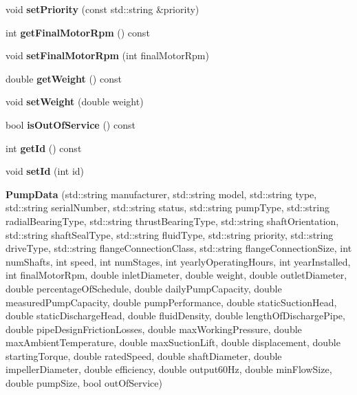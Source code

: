 \begin{DoxyCompactItemize}
\item 
\mbox{\label{class_pump_data_aea2420ebfa204d0bbda6f322729c11c3}} 
void {\bfseries set\+Priority} (const std\+::string \&priority)
\item 
\mbox{\label{class_pump_data_ace9256fdd3afebb9f2f8647234f7f9af}} 
int {\bfseries get\+Final\+Motor\+Rpm} () const
\item 
\mbox{\label{class_pump_data_a74de5295a37ed747c8bb0ba95271b536}} 
void {\bfseries set\+Final\+Motor\+Rpm} (int final\+Motor\+Rpm)
\item 
\mbox{\label{class_pump_data_a2e6aa462389c9319292ef4002674d009}} 
double {\bfseries get\+Weight} () const
\item 
\mbox{\label{class_pump_data_a5cc20c9d33c7000da4cf15ee8b857504}} 
void {\bfseries set\+Weight} (double weight)
\item 
\mbox{\label{class_pump_data_a638acde0858b29b9a086cf4cc6e4f73f}} 
bool {\bfseries is\+Out\+Of\+Service} () const
\item 
\mbox{\label{class_pump_data_ac7e900bf6d6ebdffb375b4d913ae6a06}} 
int {\bfseries get\+Id} () const
\item 
\mbox{\label{class_pump_data_a99da1d2ca8416ecbf85fe662ff97db45}} 
void {\bfseries set\+Id} (int id)
\item 
\mbox{\label{class_pump_data_abe0be07293009588aaca7f99170780dd}} 
{\bfseries Pump\+Data} (std\+::string manufacturer, std\+::string model, std\+::string type, std\+::string serial\+Number, std\+::string status, std\+::string pump\+Type, std\+::string radial\+Bearing\+Type, std\+::string thrust\+Bearing\+Type, std\+::string shaft\+Orientation, std\+::string shaft\+Seal\+Type, std\+::string fluid\+Type, std\+::string priority, std\+::string drive\+Type, std\+::string flange\+Connection\+Class, std\+::string flange\+Connection\+Size, int num\+Shafts, int speed, int num\+Stages, int yearly\+Operating\+Hours, int year\+Installed, int final\+Motor\+Rpm, double inlet\+Diameter, double weight, double outlet\+Diameter, double percentage\+Of\+Schedule, double daily\+Pump\+Capacity, double measured\+Pump\+Capacity, double pump\+Performance, double static\+Suction\+Head, double static\+Discharge\+Head, double fluid\+Density, double length\+Of\+Discharge\+Pipe, double pipe\+Design\+Friction\+Losses, double max\+Working\+Pressure, double max\+Ambient\+Temperature, double max\+Suction\+Lift, double displacement, double starting\+Torque, double rated\+Speed, double shaft\+Diameter, double impeller\+Diameter, double efficiency, double output60\+Hz, double min\+Flow\+Size, double pump\+Size, bool out\+Of\+Service)

\end{DoxyCompactItemize}
